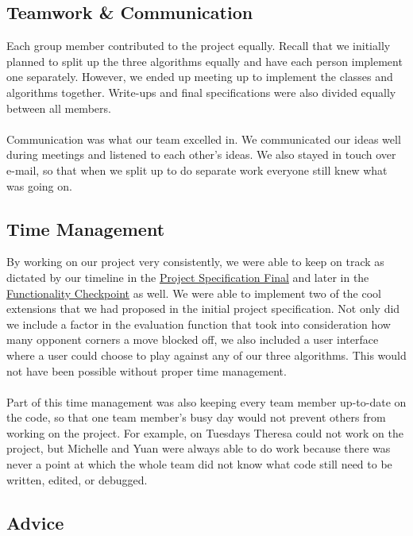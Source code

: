 \documentclass[11pt]{article}
\begin{document}
\subsection{Teamwork \& Communication}

Each group member contributed to the project equally. Recall that we initially planned to split up the three algorithms equally and have each person implement one separately. However, we ended up meeting up to implement the classes and algorithms together. Write-ups and final specifications were also divided equally between all members.
\\\\
Communication was what our team excelled in. We communicated our ideas well during meetings and listened to each other's ideas. We also stayed in touch over e-mail, so that when we split up to do separate work everyone still knew what was going on.

\subsection{Time Management}

By working on our project very consistently, we were able to keep on track as dictated by our timeline in the \href{run:report/Final Project Specification (Final) Ann..pdf}{Project Specification Final} and later in the \href{run:report/Functionality_Checkpoint Ann..pdf}{Functionality Checkpoint} as well. We were able to implement two of the cool extensions that we had proposed in the initial project specification. Not only did we include a factor in the evaluation function that took into consideration how many opponent corners a move blocked off, we also included a user interface where a user could choose to play against any of our three algorithms. This would not have been possible without proper time management.
\\\\
Part of this time management was also keeping every team member up-to-date on the code, so that one team member's busy day would not prevent others from working on the project. For example, on Tuesdays Theresa could not work on the project, but Michelle and Yuan were always able to do work because there was never a point at which the whole team did not know what code still need to be written, edited, or debugged.

\subsection{Advice}
\end{document}
